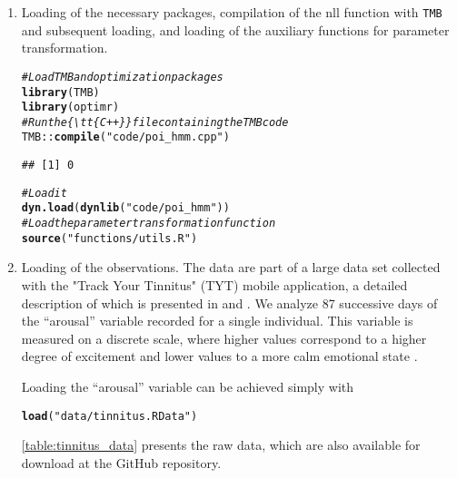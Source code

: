 \documentclass[bimj,fleqn]{w-art}\usepackage[]{graphicx}\usepackage[]{color}
\makeatletter
\newcommand{\hlstr}[1]{\textcolor[rgb]{0.192,0.494,0.8}{#1}}%
\newcommand{\hlcom}[1]{\textcolor[rgb]{0.678,0.584,0.686}{\textit{#1}}}%
\newcommand{\hlopt}[1]{\textcolor[rgb]{0,0,0}{#1}}%
\newcommand{\hlstd}[1]{\textcolor[rgb]{0.345,0.345,0.345}{#1}}%
\newcommand{\hlkwd}[1]{\textcolor[rgb]{0.737,0.353,0.396}{\textbf{#1}}}%
\newenvironment{kframe}{%
 \def\at@end@of@kframe{}%
 \ifinner\ifhmode%
  \def\at@end@of@kframe{\end{minipage}}%
  \begin{minipage}{\columnwidth}%
 \fi\fi%
 \def\FrameCommand##1{\hskip\@totalleftmargin \hskip-\fboxsep
 \colorbox{shadecolor}{##1}\hskip-\fboxsep
     \hskip-\linewidth \hskip-\@totalleftmargin \hskip\columnwidth}%
 \MakeFramed {\advance\hsize-\width
   \@totalleftmargin\z@ \linewidth\hsize
   \@setminipage}}%
 {\par\unskip\endMakeFramed%
 \at@end@of@kframe}
\newenvironment{knitrout}{}{} %
\theoremstyle{plain}
\theoremstyle{definition}
\makeatother
\begin{document}
\begin{enumerate}
\item Loading of the necessary packages, compilation of the nll function with {\tt{TMB}} and subsequent loading, and loading of the auxiliary functions for parameter transformation.
\begin{knitrout}
\color{fgcolor}\begin{kframe}
\begin{alltt}
\hlcom{# Load TMB and optimization packages}
\hlkwd{library}\hlstd{(TMB)}
\hlkwd{library}\hlstd{(optimr)}
\hlcom{# Run the \{\textbackslash{}tt\{C++\}\} file containing the TMB code}
\hlstd{TMB}\hlopt{::}\hlkwd{compile}\hlstd{(}\hlstr{"code/poi_hmm.cpp"}\hlstd{)}
\end{alltt}
\begin{verbatim}
## [1] 0
\end{verbatim}
\begin{alltt}
\hlcom{# Load it}
\hlkwd{dyn.load}\hlstd{(}\hlkwd{dynlib}\hlstd{(}\hlstr{"code/poi_hmm"}\hlstd{))}
\hlcom{# Load the parameter transformation function}
\hlkwd{source}\hlstd{(}\hlstr{"functions/utils.R"}\hlstd{)}
\end{alltt}
\end{kframe}
\end{knitrout}

\item Loading of the observations. The data are part of a large data set collected with the "Track Your Tinnitus" (TYT) mobile application, a detailed description of which is presented in \citet{pryss} and \citet{pryssa}.
We analyze 87 successive days of the ``arousal'' variable recorded for a single individual. This variable is measured on a discrete scale, where higher values correspond to a higher degree of excitement and lower values to a more calm emotional state \citep[for details, see][]{probst, probsta}.

Loading the ``arousal'' variable can be achieved simply with
\begin{knitrout}
\color{fgcolor}\begin{kframe}
\begin{alltt}
\hlkwd{load}\hlstd{(}\hlstr{"data/tinnitus.RData"}\hlstd{)}
\end{alltt}
\end{kframe}
\end{knitrout}

\autoref{table:tinnitus_data} presents the raw data, which are also available for download at the GitHub repository.


\end{enumerate}
\end{document}
